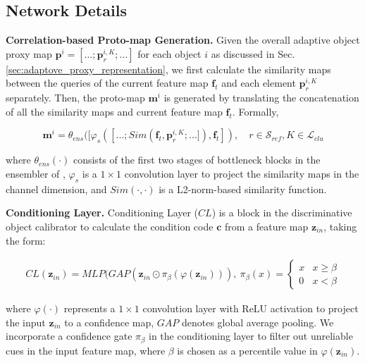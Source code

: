 \documentclass[sigconf]{acmart}
\begin{document}
 
\subsection{Network Details}

\noindent\textbf{Correlation-based Proto-map Generation.}
Given the overall adaptive object proxy map $\mathbf{p}^i = [...; \mathbf{p}_{r}^{i,K}; ...]$ for each object $i$ as discussed in Sec.{\ref{sec:adaptove_proxy_representation}}, 
we first calculate the similarity maps between the queries of the current feature map $\mathbf{f}_{t}$ and each element $\mathbf{p}_{r}^{i,K}$ separately.
Then, the proto-map $\mathbf{m}^i$ is generated by translating the concatenation of all the similarity maps and current feature map $\mathbf{f}_{t}$. Formally,
\begin{small}
\begin{equation}
    \mathbf{m}^i = \theta_{ens} ([\varphi_s ([...; Sim(\mathbf{f}_t,  \mathbf{p}_{r}^{i,K}; ...]),\mathbf{f}_t]),  \quad r \in \mathcal{S}_{ref}, K \in \mathcal{L}_{clu}
\end{equation}
\end{small}
where $\theta_{ens}(\cdot)$ consists of the first two stages of bottleneck blocks in the ensembler of \cite{yang2020collaborative}, $\varphi_s$ is a $1\times1$ convolution layer to project the similarity maps in the channel dimension, and $Sim(\cdot,\cdot)$ is a L2-norm-based similarity function.



\noindent\textbf{Conditioning Layer.}\label{sec:method/relational_modulation_network/conditioning_layer} Conditioning Layer ($CL$) is a block in the discriminative object calibrator to calculate the condition code $\mathbf{c}$ from a feature map $\mathbf{z}_{in}$, taking the form:
\begin{small}
\begin{align}
	 CL(\mathbf{z}_{in}) =  MLP (GAP(\mathbf{z}_{in} \odot \pi_{\beta}( \varphi (\mathbf{z}_{in}) )),~
	\pi_{\beta}(x) = 
	\begin{cases}
		x & x \ge \beta \\
		0 & x < \beta
	\end{cases}
\end{align}
\end{small}
where $\varphi (\cdot)$ represents a $1\times 1$ convolution layer with ReLU activation to project the input $\mathbf{z}_{in}$ to a confidence map, $GAP$ denotes global average pooling. We incorporate a confidence gate $\pi_{\beta}$ in the conditioning layer to filter out unreliable cues in the input feature map, where $\beta$ is chosen as a percentile value in $\varphi(\mathbf{z}_{in})$.
\end{document}
